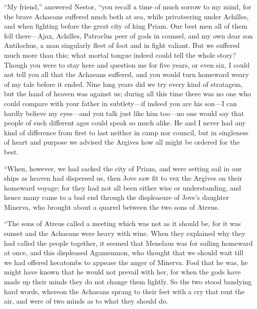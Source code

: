 “My friend,” answered Nestor, “you recall a time of much sorrow to my mind, for
the brave Achaeans suffered much both at sea, while privateering under
Achilles, and when fighting before the great city of king Priam. Our best men
all of them fell there—Ajax, Achilles, Patroclus peer of gods in counsel, and
my own dear son Antilochus, a man singularly fleet of foot and in fight
valiant. But we suffered much more than this; what mortal tongue indeed could
tell the whole story? Though you were to stay here and question me for five
years, or even six, I could not tell you all that the Achaeans suffered, and
you would turn homeward weary of my tale before it ended. Nine long years did
we try every kind of stratagem, but the hand of heaven was against us; during
all this time there was no one who could compare with your father in
subtlety—if indeed you are his son—I can hardly believe my eyes—and you talk
just like him too—no one would say that people of such different ages could
speak so much alike. He and I never had any kind of difference from first to
last neither in camp nor council, but in singleness of heart and purpose we
advised the Argives how all might be ordered for the best.

“When, however, we had sacked the city of Priam, and were setting sail in our
ships as heaven had dispersed us, then Jove saw fit to vex the Argives on their
homeward voyage; for they had not all been either wise or understanding, and
hence many came to a bad end through the displeasure of Jove’s daughter
Minerva, who brought about a quarrel between the two sons of Atreus.

“The sons of Atreus called a meeting which was not as it should be, for it was
sunset and the Achaeans were heavy with wine. When they explained why they had
called the people together, it seemed that Menelaus was for sailing homeward at
once, and this displeased Agamemnon, who thought that we should wait till we
had offered hecatombs to appease the anger of Minerva. Fool that he was, he
might have known that he would not prevail with her, for when the gods have
made up their minds they do not change them lightly. So the two stood bandying
hard words, whereon the Achaeans sprang to their feet with a cry that rent the
air, and were of two minds as to what they should do.

